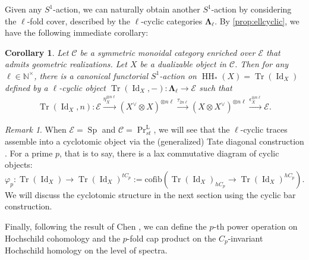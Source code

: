 \documentclass[11pt]{amsart}
\numberwithin{equation}{section}
\theoremstyle{plain}
\newtheorem{Coro}[coro]{Corollary}
\theoremstyle{definition}
\theoremstyle{remark}
\newtheorem{RMK}[rmk]{Remark}
\newcommand{\bN} { {\mathbb{N}}}
\newcommand{\cC} { {\mathcal{C}}}
\newcommand{\cE} { {\mathcal{E}}}
\newcommand{\Id}{{\operatorname{Id}}}
\newcommand\HH{\operatorname{HH}}
\newcommand\Tr{\operatorname{Tr}}
\newcommand\PrLst{  {  \operatorname{Pr}^{\operatorname{L} }_{st} } }
\newcommand\Sp{ {\operatorname{Sp} } }
\begin{document}
Given any $S^1$-action, we can naturally obtain another $S^1$-action by considering the $\ell$-fold cover, described by the $\ell$-cyclic categories $\boldsymbol{\Lambda}_\ell$. By \autoref{prop:ellcyclic}, we have the following immediate corollary:


\begin{Coro}
    Let $\cC$ be a symmetric monoidal category enriched over $\cE$ that admits geometric realizations. Let $X$ be a dualizable object in $\cC$. Then for any $\ell \in \bN^\times$, there is a canonical functorial $S^1$-action on $\HH_*(X) = \Tr(\Id_X)$ defined by a $\ell$-cyclic object $\Tr(\Id_X, -) : \boldsymbol{\Lambda}_\ell \to \cE$ such that
    \begin{align*}
        \Tr(\Id_X, n): \cE \xrightarrow{\eta_X^{\otimes n\ell}} (X^\vee \otimes X)^{\otimes n\ell} \xrightarrow{\tau_{2n\ell}} (X \otimes X^\vee)^{\otimes n\ell} \xrightarrow{\epsilon_X^{\otimes n\ell}} \cE.
    \end{align*}    
\end{Coro}

\begin{RMK}
    When $\cE = \Sp$ and $\cC = \PrLst$, we will see that the $\ell$-cyclic traces assemble into a cyclotomic object via the (generalized) Tate diagonal construction \cite[Chapter III.1]{Nikolaus-Scholze-Ontopologicalcyclichomology} \cite[Section 3.1]{AMGR-naive} \cite[Section 4.1--4.3]{AMGR-cyclotomic}. For a prime $p$, that is to say, there is a lax commutative diagram of cyclic objects:
    \[\varphi_p: \Tr(\Id_X) \to \Tr(\Id_X)^{tC_p}:= \mathrm{cofib}(\Tr(\Id_X)_{hC_p} \to \Tr(\Id_X)^{hC_p}).\]
    We will discuss the cyclotomic structure in the next section using the cyclic bar construction.
\end{RMK}

Finally, following the result of Chen \cite{Chen2}, we can define the $p$-th power operation on Hochschild cohomology and the $p$-fold cap product on the $C_p$-invariant Hochschild homology on the level of spectra.
\end{document}
